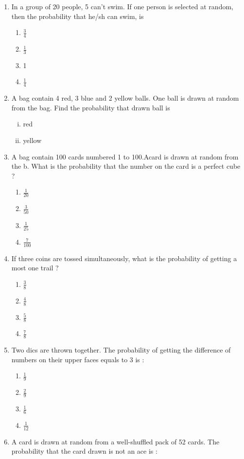 \documentclass{article}
\begin{document}
\begin{enumerate}
\begin{enumerate}
			\end{enumerate}
  	\item In a group of 20 people, 5 can't swim. If one person is selected at random, then the probability that he/sh can swim, is
			\begin{enumerate}
				\item $ \frac {3} {4} $
				\item $ \frac {1} {3} $
				\item 1
				\item $ \frac {1} {4} $ 
			\end{enumerate}
	\item A bag contain 4 red, 3 blue and 2 yellow balls. One ball is drawn at random from the bag. Find the probability that drawn ball is
		\begin{enumerate}[(i)]
					\item red
					\item yellow
		\end{enumerate}
	\item A bag contain 100 cards numbered 1 to 100.Acard is drawn at random from the b. What is the probability that the number on the card is a perfect cube ?
			\begin{enumerate}
				\item $ \frac {1} {20} $
				\item $ \frac {3} {50} $
				\item $ \frac {1} {25} $
				\item $ \frac {7} {100} $
			\end{enumerate}
	\item If three coins are tossed simultaneously, what is the probability of getting a most one trail ?
			\begin{enumerate}
 				\item $ \frac {3} {8} $
				\item $ \frac {4} {8} $
				\item $ \frac {5} {8} $
				\item $ \frac {7} {8} $
			\end{enumerate}
	\item Two dics are thrown together. The probability of getting the difference of numbers on their upper faces equals to 3 is :
			\begin{enumerate}
				\item $ \frac {1} {9} $
				\item $ \frac {2} {9} $
				\item $ \frac {1} {6} $
				\item $ \frac {1} {12} $
			\end{enumerate}
	\item A card is drawn at random from a well-shuffled pack of 52 cards. The probability that the card drawn is not an ace is : 


\end{enumerate}
\end{document}
